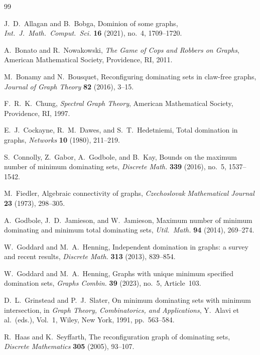 \documentclass[11pt]{article}
\theoremstyle{plain}
\theoremstyle{definition}
\theoremstyle{remark}
\begin{document}
\begin{thebibliography}{99}

J.~D.~Allagan and B.~Bobga,
Dominion of some graphs,
\emph{Int.\ J.\ Math.\ Comput.\ Sci.} \textbf{16} (2021), no.~4, 1709--1720.

A.~Bonato and R.~Nowakowski,
\emph{The Game of Cops and Robbers on Graphs},
American Mathematical Society, Providence, RI, 2011.

M.~Bonamy and N.~Bousquet,
Reconfiguring dominating sets in claw-free graphs,
\emph{Journal of Graph Theory} \textbf{82} (2016), 3--15.

F.~R.~K.~Chung,
\emph{Spectral Graph Theory},
American Mathematical Society, Providence, RI, 1997.

E.~J.~Cockayne, R.~M.~Dawes, and S.~T.~Hedetniemi,
Total domination in graphs,
\emph{Networks} \textbf{10} (1980), 211--219.

S.~Connolly, Z.~Gabor, A.~Godbole, and B.~Kay,
Bounds on the maximum number of minimum dominating sets,
\emph{Discrete Math.} \textbf{339} (2016), no.~5, 1537--1542.

M.~Fiedler,
Algebraic connectivity of graphs,
\emph{Czechoslovak Mathematical Journal} \textbf{23} (1973), 298--305.

A.~Godbole, J.~D.~Jamieson, and W.~Jamieson,
Maximum number of minimum dominating and minimum total dominating sets,
\emph{Util.\ Math.} \textbf{94} (2014), 269--274.

W.~Goddard and M.~A.~Henning,
Independent domination in graphs: a survey and recent results,
\emph{Discrete Math.} \textbf{313} (2013), 839--854.

W.~Goddard and M.~A.~Henning,
Graphs with unique minimum specified domination sets,
\emph{Graphs Combin.} \textbf{39} (2023), no.~5, Article~103.

D.~L.~Grinstead and P.~J.~Slater,
On minimum dominating sets with minimum intersection,
in \emph{Graph Theory, Combinatorics, and Applications},
Y.~Alavi et al.\ (eds.), Vol.~1,
Wiley, New York, 1991, pp.~563--584.

R.~Haas and K.~Seyffarth,
The reconfiguration graph of dominating sets,
\emph{Discrete Mathematics} \textbf{305} (2005), 93--107.


\end{thebibliography}
\end{document}
